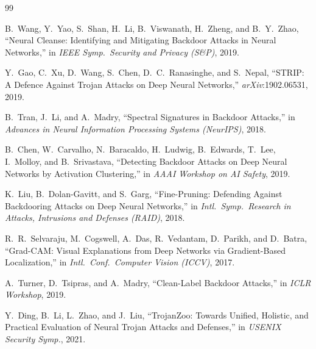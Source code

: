 \documentclass[12pt, letterpaper]{article}
\begin{document}
\FloatBarrier


\clearpage
\begin{thebibliography}{99}

B.~Wang, Y.~Yao, S.~Shan, H.~Li, B.~Viswanath, H.~Zheng, and B.~Y.~Zhao,
``Neural Cleanse: Identifying and Mitigating Backdoor Attacks in Neural
Networks,'' in \emph{IEEE Symp.\ Security and Privacy (S\&P)}, 2019.

Y.~Gao, C.~Xu, D.~Wang, S.~Chen, D.~C.~Ranasinghe, and S.~Nepal,
``STRIP: A Defence Against Trojan Attacks on Deep Neural Networks,''
\textit{arXiv}:1902.06531, 2019.

B.~Tran, J.~Li, and A.~Madry,
``Spectral Signatures in Backdoor Attacks,''
in \emph{Advances in Neural Information Processing Systems (NeurIPS)}, 2018.

B.~Chen, W.~Carvalho, N.~Baracaldo, H.~Ludwig, B.~Edwards, T.~Lee,
I.~Molloy, and B.~Srivastava,
``Detecting Backdoor Attacks on Deep Neural Networks by Activation
Clustering,'' in \emph{AAAI Workshop on AI Safety}, 2019.

K.~Liu, B.~Dolan-Gavitt, and S.~Garg,
``Fine-Pruning: Defending Against Backdooring Attacks on Deep Neural
Networks,'' in \emph{Intl.\ Symp.\ Research in Attacks, Intrusions and
Defenses (RAID)}, 2018.

R.~R.~Selvaraju, M.~Cogswell, A.~Das, R.~Vedantam, D.~Parikh, and D.~Batra,
``Grad-CAM: Visual Explanations from Deep Networks via Gradient-Based
Localization,'' in \emph{Intl.\ Conf.\ Computer Vision (ICCV)}, 2017.

A.~Turner, D.~Tsipras, and A.~Madry,
``Clean-Label Backdoor Attacks,'' in \emph{ICLR Workshop}, 2019.

Y.~Ding, B.~Li, L.~Zhao, and J.~Liu,
``TrojanZoo: Towards Unified, Holistic, and Practical Evaluation of Neural
Trojan Attacks and Defenses,'' in \emph{USENIX Security Symp.}, 2021.

\end{thebibliography}
\end{document}
